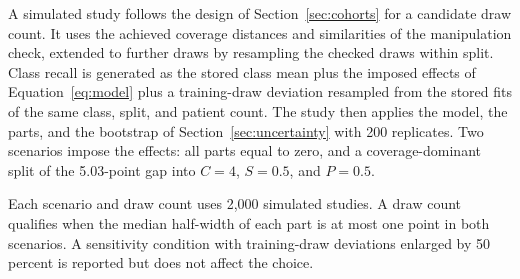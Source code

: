 \documentclass[11pt]{article}
\begin{document}
A simulated study follows the design of Section~\ref{sec:cohorts} for a candidate draw count. It uses the achieved coverage distances and similarities of the manipulation check, extended to further draws by resampling the checked draws within split. Class recall is generated as the stored class mean plus the imposed effects of Equation~\eqref{eq:model} plus a training-draw deviation resampled from the stored fits of the same class, split, and patient count. The study then applies the model, the parts, and the bootstrap of Section~\ref{sec:uncertainty} with 200 replicates. Two scenarios impose the effects: all parts equal to zero, and a coverage-dominant split of the 5.03-point gap into $C=4$, $S=0.5$, and $P=0.5$.

Each scenario and draw count uses 2,000 simulated studies. A draw count qualifies when the median half-width of each part is at most one point in both scenarios. A sensitivity condition with training-draw deviations enlarged by 50 percent is reported but does not affect the choice.



\end{document}
